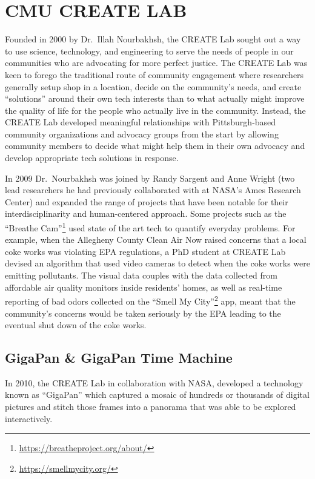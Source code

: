 \documentclass[
]{krantz}
\renewcommand{\href}[2]{#2\footnote{\url{#1}}}
\begin{document}
\hypertarget{cmu-create-lab}{%
\section{CMU CREATE LAB}\label{cmu-create-lab}}

Founded in 2000 by Dr.~Illah Nourbakhsh, the CREATE Lab sought out a way to use science, technology, and engineering to serve the needs of people in our communities who are advocating for more perfect justice. The CREATE Lab was keen to forego the traditional route of community engagement where researchers generally setup shop in a location, decide on the community's needs, and create ``solutions'' around their own tech interests than to what actually might improve the quality of life for the people who actually live in the community. Instead, the CREATE Lab developed meaningful relationships with Pittsburgh-based community organizations and advocacy groups from the start by allowing community members to decide what might help them in their own advocacy and develop appropriate tech solutions in response.

In 2009 Dr.~Nourbakhsh was joined by Randy Sargent and Anne Wright (two lead researchers he had previously collaborated with at NASA's Ames Research Center) and expanded the range of projects that have been notable for their interdisciplinarity and human-centered approach. Some projects such as the \href{https://breatheproject.org/about/}{``Breathe Cam''} used state of the art tech to quantify everyday problems. For example, when the Allegheny County Clean Air Now raised concerns that a local coke works was violating EPA regulations, a PhD student at CREATE Lab devised an algorithm that used video cameras to detect when the coke works were emitting pollutants. The visual data couples with the data collected from affordable air quality monitors inside residents' homes, as well as real-time reporting of bad odors collected on the \href{https://smellmycity.org/}{``Smell My City''} app, meant that the community's concerns would be taken seriously by the EPA leading to the eventual shut down of the coke works.

\hypertarget{gigapan-gigapan-time-machine}{%
\subsection*{GigaPan \& GigaPan Time Machine}\label{gigapan-gigapan-time-machine}}


In 2010, the CREATE Lab in collaboration with NASA, developed a technology known as ``GigaPan'' which captured a mosaic of hundreds or thousands of digital pictures and stitch those frames into a panorama that was able to be explored interactively.
\end{document}
